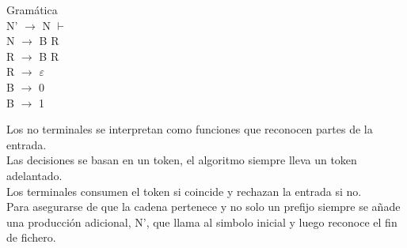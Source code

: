 \documentclass[\main/ApuntesPL.tex]{subfiles}
\begin{document}
    \begin{center}
      \begin{minipage}{.2\textwidth}
        \par
        Gramática\\
        \hspace*{5mm}N' $\rightarrow$ N $\vdash$\\
        \hspace*{5mm}N $\rightarrow$ B R\\
        \hspace*{5mm}R $\rightarrow$ B R\\
        \hspace*{5mm}R $\rightarrow$ $\varepsilon$\\
        \hspace*{5mm}B $\rightarrow$ 0\\
        \hspace*{5mm}B $\rightarrow$ 1
      \end{minipage}%
      \begin{minipage}{.8\textwidth}
        \par
        Los no terminales se interpretan como funciones que reconocen partes de la entrada.\\
        Las decisiones se basan en un token, el algoritmo siempre lleva un token adelantado.\\
        Los terminales consumen el token si coincide y rechazan la entrada si no.\\
        Para asegurarse de que la cadena pertenece y no solo un prefijo siempre se añade una
        producción adicional, N', que llama al simbolo inicial y luego reconoce el fin de fichero.
      \end{minipage}
    \end{center}
\end{document}
